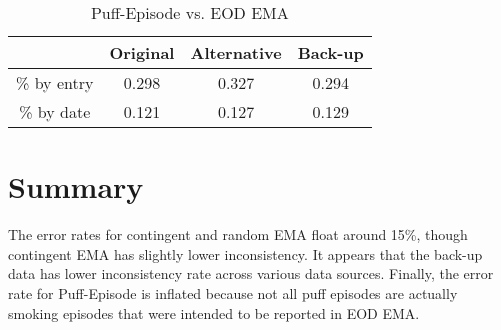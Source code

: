 \documentclass[11pt]{article}
\begin{document}
\begin{table}[h]
\centering
\begin{tabular}{|c|c|c|c|} 
 \hline
& Original & Alternative & Back-up \\
\hline
\% by entry & 0.298 & 0.327 & 0.294 \\
\hline
\% by date & 0.121 & 0.127 & 0.129 \\
\hline
\end{tabular}
\caption{Puff-Episode vs. EOD EMA}
\label{table:3}
\end{table}

\section{Summary}
The error rates for contingent and random EMA float around 15\%, though contingent EMA has slightly lower inconsistency. It appears that the back-up data has lower inconsistency rate across various data sources. Finally, the error rate for Puff-Episode is inflated because not all puff episodes are actually smoking episodes that were intended to be reported in EOD EMA.
\end{document}
